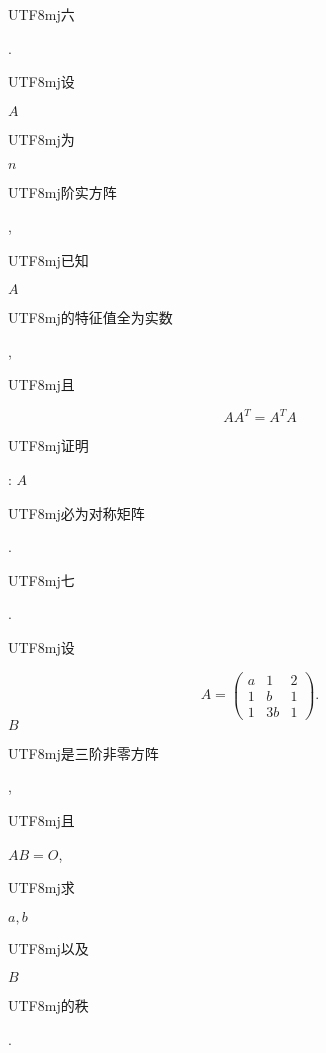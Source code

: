 \documentclass[10pt]{article}
\begin{document}
\begin{CJK}{UTF8}{mj}六\end{CJK}. \begin{CJK}{UTF8}{mj}设\end{CJK} $A$ \begin{CJK}{UTF8}{mj}为\end{CJK} $n$ \begin{CJK}{UTF8}{mj}阶实方阵\end{CJK}, \begin{CJK}{UTF8}{mj}已知\end{CJK} $A$ \begin{CJK}{UTF8}{mj}的特征值全为实数\end{CJK}, \begin{CJK}{UTF8}{mj}且\end{CJK}
$$
A A^{T}=A^{T} A
$$
\begin{CJK}{UTF8}{mj}证明\end{CJK}: $A$ \begin{CJK}{UTF8}{mj}必为对称矩阵\end{CJK}. \begin{CJK}{UTF8}{mj}七\end{CJK}. \begin{CJK}{UTF8}{mj}设\end{CJK}
$$
A=\left(\begin{array}{ccc}
a & 1 & 2 \\
1 & b & 1 \\
1 & 3 b & 1
\end{array}\right) .
$$
$B$ \begin{CJK}{UTF8}{mj}是三阶非零方阵\end{CJK}, \begin{CJK}{UTF8}{mj}且\end{CJK} $A B=O$, \begin{CJK}{UTF8}{mj}求\end{CJK} $a, b$ \begin{CJK}{UTF8}{mj}以及\end{CJK} $B$ \begin{CJK}{UTF8}{mj}的秩\end{CJK}.
\end{document}

